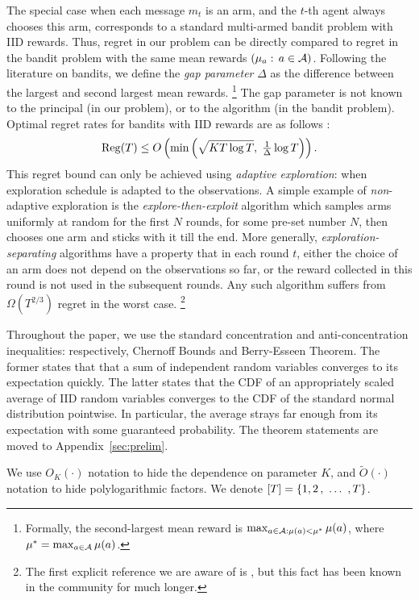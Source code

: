 The special case when each message $m_t$ is an arm, and the $t$-th agent always chooses this arm, corresponds to a standard multi-armed bandit problem with IID rewards. Thus, regret in our problem can be directly compared to regret in the bandit problem with the same mean rewards $(\mu_a:\,a\in\mathcal{A})$. Following the literature on bandits, we define the \emph{gap parameter} $\Delta$ as the difference between the largest and second largest mean rewards.%
\footnote{Formally, the second-largest mean reward is
    $\max_{a\in\mathcal{A}:\mu(a)<\mu^*} \mu(a)$,
where $\mu^* = \max_{a\in\mathcal{A}} \mu(a)$.
}
The gap parameter is not known to the principal (in our problem), or to the algorithm (in the bandit problem). Optimal regret rates for bandits with IID rewards are as follows \cite{bandits-ucb1,bandits-exp3,Lai-Robbins-85}:
\begin{align}\label{eq:model-OptRegret}
\mathrm{Reg}(T) \leq O\left(\min\left(
    \sqrt{KT\log T},\; \tfrac{1}{\Delta} \log T
    \right)\right).
\end{align}
This regret bound can only be achieved using \emph{adaptive exploration}: \ie when exploration schedule is adapted to the observations. A simple example of \emph{non}-adaptive exploration is the \emph{explore-then-exploit} algorithm which samples arms uniformly at random for the first $N$ rounds, for some pre-set number $N$, then chooses one arm and sticks with it till the end. More generally,
\emph{exploration-separating} algorithms have a property that in each round $t$, either the choice of an arm does not depend on the observations so far, or the reward collected in this round is not used in the subsequent rounds. Any such algorithm suffers from $\Omega(T^{2/3})$ regret in the worst case.%
\footnote{The first explicit reference we are aware of is \cite{MechMAB-ec09,DevanurK09}, but this fact has been known in the community for much longer.}


Throughout the paper, we use the standard concentration and anti-concentration inequalities: respectively, Chernoff Bounds and Berry-Esseen Theorem. The former states that that a sum of independent random variables converges to its expectation quickly. The latter states that the CDF of an appropriately scaled average of IID random variables converges to the CDF of the standard normal distribution pointwise. In particular, the average strays far enough from its expectation with some guaranteed probability. The theorem statements are moved to Appendix~\ref{sec:prelim}.

We use $O_K(\cdot)$ notation to hide the dependence on parameter $K$, and $\tilde O(\cdot)$ notation to hide polylogarithmic factors. We denote $[T]= \{1,2 \, ,\ \ldots\ , T\}$.



